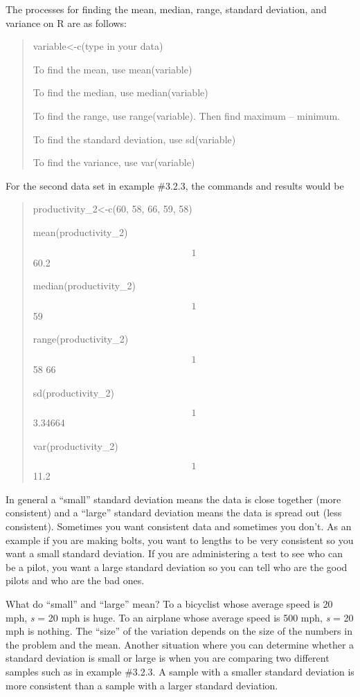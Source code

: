 \documentclass[]{book}
\begin{document}
The processes for finding the mean, median, range, standard deviation,
and variance on R are as follows:

\begin{quote}
variable\textless{}-c(type in your data)

To find the mean, use mean(variable)

To find the median, use median(variable)

To find the range, use range(variable). Then find maximum -- minimum.

To find the standard deviation, use sd(variable)

To find the variance, use var(variable)
\end{quote}

For the second data set in example \#3.2.3, the commands and results
would be

\begin{quote}
productivity\_2\textless{}-c(60, 58, 66, 59, 58)

mean(productivity\_2)

\[1\] 60.2

median(productivity\_2)

\[1\] 59

range(productivity\_2)

\[1\] 58 66

sd(productivity\_2)

\[1\] 3.34664

var(productivity\_2)

\[1\] 11.2
\end{quote}

In general a ``small'' standard deviation means the data is close together
(more consistent) and a ``large'' standard deviation means the data is
spread out (less consistent). Sometimes you want consistent data and
sometimes you don't. As an example if you are making bolts, you want to
lengths to be very consistent so you want a small standard deviation. If
you are administering a test to see who can be a pilot, you want a large
standard deviation so you can tell who are the good pilots and who are
the bad ones.

What do ``small'' and ``large'' mean? To a bicyclist whose average speed is
20 mph, \emph{s} = 20 mph is huge. To an airplane whose average speed is 500
mph, \emph{s} = 20 mph is nothing. The ``size'' of the variation depends on the
size of the numbers in the problem and the mean. Another situation where
you can determine whether a standard deviation is small or large is when
you are comparing two different samples such as in example \#3.2.3. A
sample with a smaller standard deviation is more consistent than a
sample with a larger standard deviation.
\end{document}
